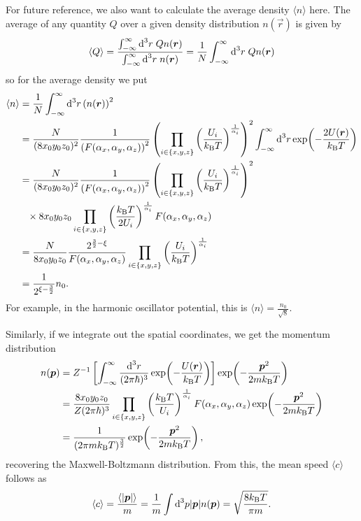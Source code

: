 For future reference, we also want to calculate the average density $\langle n\rangle$ here. The average of any quantity $Q$ over a given density distribution $n(\vec{r})$ is given by
\[\langle Q\rangle = \frac{\int_{-\infty}^\infty \text{d}^{3}r\; Q n(\boldsymbol{r})}{\int_{-\infty}^\infty \text{d}^{3}r\; n(\boldsymbol{r})} = \frac{1}{N} \int_{-\infty}^\infty \text{d}^{3}r\; Q n(\boldsymbol{r})\]
so for the average density we put
\begin{align}
    \langle n\rangle &= \frac{1}{N} \int_{-\infty}^{\infty} \text{d}^{3}r \left(n(\boldsymbol{r})\right)^2 \nonumber \\
    &= \frac{N}{(8x_0y_0z_0)^2} \frac{1}{\left(F(\alpha_x,\alpha_y,\alpha_z)\right)^2} \left(\prod_{i\in\{x,y,z\}} \left(\frac{U_i}{k_\text{B} T}\right)^{\frac{1}{\alpha_i}} \right)^2 \int_{-\infty}^{\infty} \text{d}^{3}r \exp\!\left(-\frac{2U(\boldsymbol{r})}{k_\text{B} T}\right) \nonumber \\
    &= \frac{N}{(8x_0y_0z_0)^2} \frac{1}{\left(F(\alpha_x,\alpha_y,\alpha_z)\right)^2} \left(\prod_{i\in\{x,y,z\}} \left(\frac{U_i}{k_\text{B} T}\right)^{\frac{1}{\alpha_i}} \right)^2 \nonumber \\
    &\phantom{=} \times 8x_0y_0z_0 \prod_{i\in\{x,y,z\}} \left(\frac{k_\text{B} T}{2 U_i}\right)^{\frac{1}{\alpha_i}} F(\alpha_x,\alpha_y,\alpha_z) \nonumber \\
    &= \frac{N}{8x_0y_0z_0} \frac{2^{\frac{3}{2} - \xi}}{F(\alpha_x,\alpha_y,\alpha_z)} \prod_{i\in\{x,y,z\}} \left(\frac{U_i}{k_\text{B} T}\right)^{\frac{1}{\alpha_i}} \nonumber \\
    &= \frac{1}{2^{\xi - \frac{3}{2}}} n_0. \label{eq:mean_density}
\end{align}
For example, in the harmonic oscillator potential, this is $\langle n\rangle = \frac{n_0}{\sqrt{8}}$.

Similarly, if we integrate out the spatial coordinates, we get the momentum distribution
\begin{align}
    n(\boldsymbol{p}) &= Z^{-1} \left[\int_{-\infty}^\infty \frac{\text{d}^{3}r}{(2\pi\hbar)^3} \exp\!\left(-\frac{U(\boldsymbol{r})}{k_\text{B} T}\right) \right]\exp\!\left(-\frac{\boldsymbol{p}^2}{2mk_\text{B} T}\right)\nonumber \\
    &= \frac{8x_0y_0z_0}{Z(2\pi\hbar)^3} \prod_{i\in\{x,y,z\}} \left(\frac{k_\text{B} T}{U_i}\right)^{\frac{1}{\alpha_i}} F(\alpha_x,\alpha_y,\alpha_z) \exp\!\left(-\frac{\boldsymbol{p}^2}{2mk_\text{B} T}\right) \nonumber \\
    &= \frac{1}{(2\pi m k_\text{B} T)^\frac{3}{2}} \exp\!\left(-\frac{\boldsymbol{p}^2}{2mk_\text{B} T}\right), \nonumber
\end{align}
recovering the Maxwell-Boltzmann distribution.
From this, the mean speed $\langle c\rangle$ follows as
\begin{equation}
    \langle c\rangle = \frac{\langle |\boldsymbol{p}| \rangle}{m} = \frac{1}{m}\int \text{d}^{3}p |\boldsymbol{p}|n(\boldsymbol{p}) = \sqrt{\frac{8k_\text{B} T}{\pi m}}.
\end{equation}

